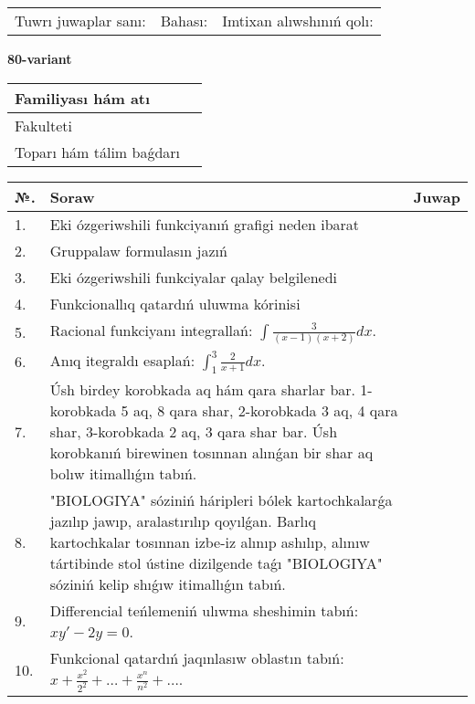 \documentclass{article}
\begin{document}
\vspace{1cm}

\begin{tabular}{ c c c }
Tuwrı juwaplar sanı: \underline{\hspace{2cm}} & Bahası: \underline{\hspace{2cm}} & Imtixan alıwshınıń qolı: \underline{\hspace{2cm}} \\
\end{tabular}

\newpage

\begin{center}\textbf{80-variant}\end{center}

\bgroup
\def\arraystretch{1.5}
\begin{tabular}{ |m{6cm}|m{10cm}| }
  \hline
  Familiyası hám atı & \\
  \hline
  Fakulteti &\\
  \hline
  Toparı hám tálim baǵdarı & \\
  \hline
\end{tabular}
\egroup

\vspace{0.5cm}

\bgroup
\def\arraystretch{2}
\begin{tabular}{ |l|m{8cm}|m{7cm}| }
  \hline
  №. & Soraw & Juwap \\
  \hline
  1. & Eki ózgeriwshili funkciyanıń grafigi neden ibarat &  \\
  \hline
  2. & Gruppalaw formulasın jazıń &  \\
  \hline
  3. & Eki ózgeriwshili funkciyalar qalay belgilenedi &  \\
  \hline
  4. & Funkcionallıq qatardıń uluwma kórinisi &  \\
  \hline
  5. & Racional funkciyanı integrallań: $\displaystyle\int {\frac{3}{(x - 1)(x + 2)}dx}$. &  \\
  \hline
  6. & Anıq itegraldı esaplań: $\displaystyle\int_{1}^{3}{\frac{2}{x + 1}dx}$. &  \\
  \hline
  7. & Úsh birdey korobkada aq hám qara sharlar bar. 1-korobkada 5 aq, 8 qara shar, 2-korobkada 3 aq, 4 qara shar, 3-korobkada 2 aq, 3 qara shar bar. Úsh korobkanıń birewinen tosınnan alınǵan bir shar aq bolıw itimallıǵın tabıń. &  \\
  \hline
  8. & "BIOLOGIYA" sóziniń háripleri bólek kartochkalarǵa jazılıp jawıp, aralastırılıp qoyılǵan. Barlıq kartochkalar tosınnan izbe-iz alınıp ashılıp, alınıw tártibinde stol ústine dizilgende taǵı "BIOLOGIYA" sóziniń kelip shıǵıw itimallıǵın tabıń. &  \\
  \hline
  9. & Differencial teńlemeniń ulıwma sheshimin tabıń: $xy' - 2y = 0$. &  \\
  \hline
  10. & Funkcional qatardıń jaqınlasıw oblastın tabıń: $\displaystyle x + \frac{x^{2}}{2^{2}} + \ldots + \frac{x^{n}}{n^{2}} + \ldots$. &  \\
  \hline
\end{tabular}
\egroup
\end{document}
